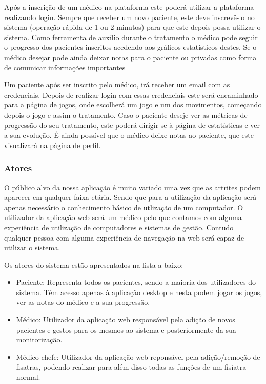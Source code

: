 \documentclass{TTUPhD}
\begin{document}
Após a inscrição de um médico na plataforma este poderá utilizar a plataforma realizando login.
Sempre que receber um novo paciente, este deve inscrevê-lo no sistema (operação rápida de 1 ou 2 minutos) para que este depois possa utilizar o sistema.
Como ferramenta de auxílio durante o tratamento o médico pode seguir o progresso dos pacientes inscritos acedendo aos gráficos estatísticos destes.
Se o médico desejar pode ainda deixar notas para o paciente ou privadas como forma de comunicar informações importantes

Um paciente após ser inscrito pelo médico, irá receber um email com as credenciais.
Depois de realizar login com essas credenciais este será encaminhado para a página de jogos, onde escolherá um jogo e um dos movimentos,
começando depois o jogo e assim o tratamento. Caso o paciente deseje ver as métricas de progressão do seu tratamento,
este poderá dirigir-se à página de estatísticas e ver a sua evolução. É ainda possível que o médico deixe notas ao paciente, que este visualizará na página de perfil.

\subsubsection{Atores}

O público alvo da nossa aplicação é muito variado uma vez que as artrites podem aparecer em qualquer faixa etária.
 Sendo que para a utilização da aplicação será apenas necessário o conhecimento
básico de utlização de um computador. O utilizador da aplicação web será um médico pelo que contamos com alguma experiência
de utilização de computadores e sistemas de gestão. Contudo qualquer pessoa com alguma experiência de navegação na web será capaz de utilizar o sistema.

Os atores do sistema estão apresentados na lista a baixo:

\begin{itemize}
    \item Paciente: Representa todos os pacientes, sendo a maioria dos utilizadores do sistema.
          Têm acesso apenas à aplicação desktop e nesta podem jogar os jogos, ver as notas do médico e a sua progressão.
    \item Médico: Utilizador da aplicação web responsável pela adição de novos pacientes e gestos para
		  os mesmos ao sistema e posteriormente da sua monitorização.
	\item Médico chefe: Utilizador da aplicação web reponsável pela adição/remoção de fisatras,
		  podendo realizar para além disso todas as funções de um fisiatra normal.
\end{itemize}
\end{document}
